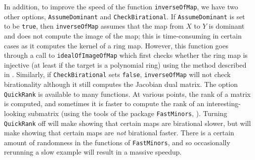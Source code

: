 \documentclass[11pt]{amsart}%
\numberwithin{equation}{theorem}
\renewcommand{\:}{\colon}
\theoremstyle{theorem}
\begin{document}
 In addition, to improve the speed of the function {\tt inverseOfMap}, we have two other options, {\tt AssumeDominant} and {\tt CheckBirational}. If {\tt AssumeDominant} is set  to be {\tt true},  then  {\tt inverseOfMap} assumes that the map from $X$ to $Y$ is dominant and does not compute the image of the map; this is time-consuming in certain cases as it computes the kernel of a ring map.  However, this function goes through a call to {\tt idealOfImageOfMap} which first checks whether the ring map is injective (at least if the target is a polynomial ring) using the method described in \cite[Proposition 1.1]{SimisTwoDifferentialThemes}.
 Similarly, if {\tt CheckBirational} sets {\tt false}, {\tt inverseOfMap} will  not check birationality although it still computes the Jacobian dual matrix.  The option {\tt QuickRank} is available to many functions.  At various points, the rank of a matrix is computed, and sometimes it is faster to compute the rank of an interesting-looking submatrix (using the tools of the package {\tt FastMinors}, \cite{FastMinorsArticle}).  Turning {\tt QuickRank} off will make showing that certain maps are birational slower, but will make showing that certain maps are \emph{not} birational faster.  There is a certain amount of randomness in the functions of {\tt FastMinors}, and so occasionally rerunning a slow example will result in a massive speedup.
\end{document}
